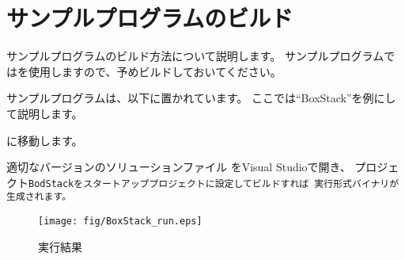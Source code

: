 \newpage
\section{サンプルプログラムのビルド}
\label{sec:SampleBuild}
\parindent=0pt

サンプルプログラムのビルド方法について説明します。
サンプルプログラムでは\SprLib を使用しますので、予めビルドしておいてください。

\bigskip
サンプルプログラムは、\SprTop{\core\src\Samples}以下に置かれています。
ここでは``BoxStack''を例にして説明します。

\bigskip
\SprTop{\core\src\Samples\Physics\BoxStack}に移動します。

適切なバージョンのソリューションファイル
をVisual Studioで開き、
プロジェクト\tt{BodStack}をスタートアッププロジェクトに設定してビルドすれば
実行形式バイナリが生成されます。

\begin{narrow}[15pt]
	\begin{figure}[h]
	\begin{center}
	\texttt{[image: fig/BoxStack\_run.eps]}
	\end{center}
	\caption{実行結果}
	\label{fig:BoxStack_run}
	\end{figure}
\end{narrow}


\bigskip
